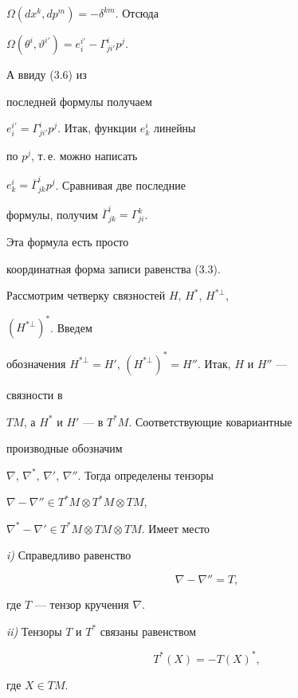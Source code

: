 \begin{pf}
$\Omega(dx^k,dp^m)=-\delta^{km}$. Отсюда 


$\Omega(\theta^i,\vartheta^{i'})=e^{i'}_i-\Gamma^i_{ji'}p^j$. 


А ввиду (3.6) из 


последней формулы получаем 


$e^{i'}_i=\Gamma^i_{ji'}p^j$. Итак, функции $e^i_k$ линейны  


по $p^j$, т.\,е. можно написать 


$e^i_k=\overline\Gamma^i_{jk}p^j$. Сравнивая две последние  


формулы, получим $\overline\Gamma^i_{jk}=\Gamma^k_{ji}$. 


Эта формула есть просто 


координатная форма записи равенства (3.3). 


\end{pf} 


 


Рассмотрим четверку связностей $H$, $H^*$, $H^{*\bot}$, 


$(H^{*\bot})^*$. Введем 


обозначения $H^{*\bot}=H'$, $(H^{*\bot})^*=H''$. Итак, $H$ и $H''$ --- 


связности в 


$TM$, а $H^*$ и $H'$ --- в $T^*M$. Соответствующие ковариантные  


производные обозначим 


$\nabla$, $\nabla^*$, $\nabla'$, $\nabla''$. Тогда определены тензоры 


$\nabla-\nabla''\in T^*M\otimes T^*M\otimes TM$, 


$\nabla^*-\nabla'\in T^*M\otimes TM\otimes TM$. Имеет место 


 


\begin{thms} {\em i)} Справедливо равенство 


\begin{equation} 


\nabla-\nabla''=T, 


\end{equation} 


где $T$ --- тензор кручения $\nabla$. 


 


{\em ii)} Тензоры $T$ и $T^*$ связаны равенством


\begin{equation} 


T^*(X)=-T(X)^*, 


\end{equation} 


где $X\in TM$. 


\end{thms}


